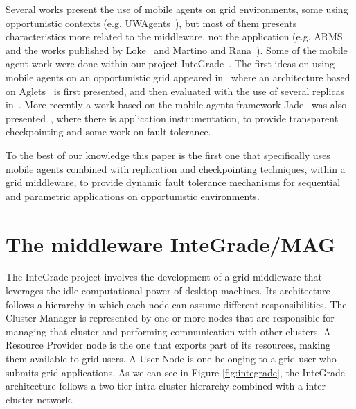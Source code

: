 \documentclass{sig-alternate}
\begin{document}
Several works present the use of mobile agents on grid environments, some using
opportunistic contexts (e.g. UWAgents~\cite{fukuda06}), but most of them
presents characteristics more related to the middleware, not the application
(e.g. ARMS~\cite{cao02} and the works published by Loke~\cite{loke03} and
Martino and Rana~\cite{martino04}). Some of the mobile agent work were done
within our project InteGrade~\cite{goldchleger04}. The first ideas on using
mobile agents on an opportunistic grid appeared in~\cite{barbosa04} where an
architecture based on Aglets~\cite{aglets} is first presented, and then
evaluated with the use of several replicas in~\cite{barbosa05}. More recently a
work based on the mobile agents framework Jade~\cite{jade} was also
presented~\cite{lopes05,lopes06_2}, where there is application instrumentation,
to provide transparent checkpointing and some work on fault tolerance.

To the best of our knowledge this paper is the first one that specifically uses
mobile agents combined with replication and checkpointing techniques, within a
grid middleware, to provide dynamic fault tolerance mechanisms for sequential
and parametric applications on opportunistic environments.


\section{The middleware InteGrade/MAG}\label{sec:arch}

The InteGrade project involves the development of a grid middleware that
leverages the idle computational power of desktop machines. 
Its architecture follows a hierarchy in which each node can assume
different responsibilities. The Cluster Manager is represented by one or more
nodes that are responsible for managing that cluster and performing
communication with other clusters. A Resource Provider node is the one that
exports part of its resources, making them available to grid users. A User Node
is one belonging to a grid user who submits grid applications. As we can see in
Figure \ref{fig:integrade}, the InteGrade architecture follows a two-tier
intra-cluster hierarchy combined with a inter-cluster network.
\end{document}
